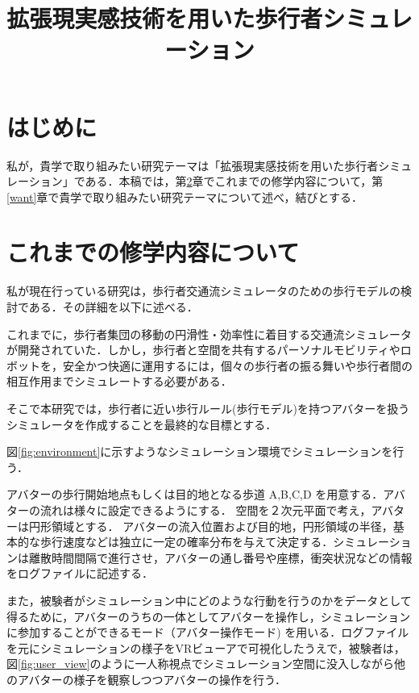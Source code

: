 \documentclass[twocolumn]{jarticle}%
\title{\vspace{5mm}\large{拡張現実感技術を用いた歩行者シミュレーション}\vspace{-15mm}}
\date{}
\begin{document}
\normalsize
\maketitle

\section{はじめに}
\thispagestyle{fancy}

私が，貴学で取り組みたい研究テーマは「拡張現実感技術を用いた歩行者シミュレーション」である．本稿では，第\ref{current}章でこれまでの修学内容について，第\ref{want}章で貴学で取り組みたい研究テーマについて述べ，結びとする．

\vspace{-2mm}
\section{これまでの修学内容について}\label{current}
私が現在行っている研究は，歩行者交通流シミュレータのための歩行モデルの検討である．その詳細を以下に述べる．

これまでに，歩行者集団の移動の円滑性・効率性に着目する交通流シミュレータが開発されていた．しかし，歩行者と空間を共有するパーソナルモビリティやロボットを，安全かつ快適に運用するには，個々の歩行者の振る舞いや歩行者間の相互作用までシミュレートする必要がある．

そこで本研究では，歩行者に近い歩行ルール(歩行モデル)を持つアバターを扱うシミュレータを作成することを最終的な目標とする．


図\ref{fig:environment}に示すようなシミュレーション環境でシミュレーションを行う．

アバターの歩行開始地点もしくは目的地となる歩道 A,B,C,D を用意する．アバターの流れは様々に設定できるようにする．
空間を２次元平面で考え，アバターは円形領域とする． アバターの流入位置および目的地，円形領域の半径，基本的な歩行速度などは独立に一定の確率分布を与えて決定する．シミュレーションは離散時間間隔で進行させ，アバターの通し番号や座標，衝突状況などの情報をログファイルに記述する． 

また，被験者がシミュレーション中にどのような行動を行うのかをデータとして得るために，アバターのうちの一体としてアバターを操作し，シミュレーションに参加することができるモード（アバター操作モード) を用いる．ログファイルを元にシミュレーションの様子をVRビューアで可視化したうえで，被験者は，図\ref{fig:user_view}のように一人称視点でシミュレーション空間に没入しながら他のアバターの様子を観察しつつアバターの操作を行う．
\end{document}
